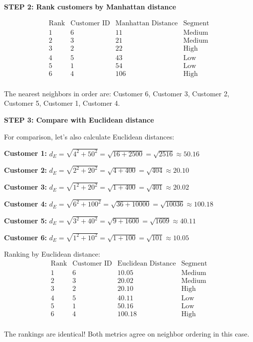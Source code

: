\documentclass[12pt]{article}
\begin{document}
\begin{solution}
\textbf{STEP 2: Rank customers by Manhattan distance}

\[
\begin{array}{c|c|c|c}
\text{Rank} & \text{Customer ID} & \text{Manhattan Distance} & \text{Segment} \\
\hline
1 & 6 & 11 & \text{Medium} \\
2 & 3 & 21 & \text{Medium} \\
3 & 2 & 22 & \text{High} \\
4 & 5 & 43 & \text{Low} \\
5 & 1 & 54 & \text{Low} \\
6 & 4 & 106 & \text{High} \\
\end{array}
\]

The nearest neighbors in order are: Customer 6, Customer 3, Customer 2, Customer 5, Customer 1, Customer 4.

\textbf{STEP 3: Compare with Euclidean distance}

For comparison, let's also calculate Euclidean distances:

\textbf{Customer 1:} \(d_E = \sqrt{4^2 + 50^2} = \sqrt{16 + 2500} = \sqrt{2516} \approx 50.16\)

\textbf{Customer 2:} \(d_E = \sqrt{2^2 + 20^2} = \sqrt{4 + 400} = \sqrt{404} \approx 20.10\)

\textbf{Customer 3:} \(d_E = \sqrt{1^2 + 20^2} = \sqrt{1 + 400} = \sqrt{401} \approx 20.02\)

\textbf{Customer 4:} \(d_E = \sqrt{6^2 + 100^2} = \sqrt{36 + 10000} = \sqrt{10036} \approx 100.18\)

\textbf{Customer 5:} \(d_E = \sqrt{3^2 + 40^2} = \sqrt{9 + 1600} = \sqrt{1609} \approx 40.11\)

\textbf{Customer 6:} \(d_E = \sqrt{1^2 + 10^2} = \sqrt{1 + 100} = \sqrt{101} \approx 10.05\)

Ranking by Euclidean distance:
\[
\begin{array}{c|c|c|c}
\text{Rank} & \text{Customer ID} & \text{Euclidean Distance} & \text{Segment} \\
\hline
1 & 6 & 10.05 & \text{Medium} \\
2 & 3 & 20.02 & \text{Medium} \\
3 & 2 & 20.10 & \text{High} \\
4 & 5 & 40.11 & \text{Low} \\
5 & 1 & 50.16 & \text{Low} \\
6 & 4 & 100.18 & \text{High} \\
\end{array}
\]

The rankings are identical! Both metrics agree on neighbor ordering in this case.
\end{solution}
\end{document}
